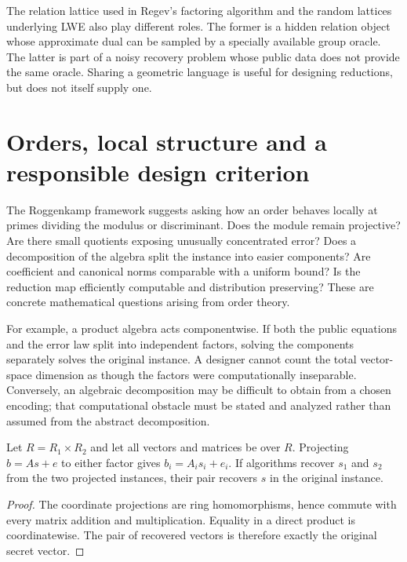 The relation lattice used in Regev's factoring algorithm and the random lattices underlying LWE also play different roles. The former is a hidden relation object whose approximate dual can be sampled by a specially available group oracle. The latter is part of a noisy recovery problem whose public data does not provide the same oracle. Sharing a geometric language is useful for designing reductions, but does not itself supply one.

\section{Orders, local structure and a responsible design criterion}
The Roggenkamp framework suggests asking how an order behaves locally at primes dividing the modulus or discriminant. Does the module remain projective? Are there small quotients exposing unusually concentrated error? Does a decomposition of the algebra split the instance into easier components? Are coefficient and canonical norms comparable with a uniform bound? Is the reduction map efficiently computable and distribution preserving? These are concrete mathematical questions arising from order theory.

For example, a product algebra acts componentwise. If both the public equations and the error law split into independent factors, solving the components separately solves the original instance. A designer cannot count the total vector-space dimension as though the factors were computationally inseparable. Conversely, an algebraic decomposition may be difficult to obtain from a chosen encoding; that computational obstacle must be stated and analyzed rather than assumed from the abstract decomposition.

\begin{proposition}
Let $R=R_1\times R_2$ and let all vectors and matrices be over $R$. Projecting
$b=As+e$ to either factor gives $b_i=A_is_i+e_i$. If algorithms recover $s_1$ and $s_2$ from the two projected instances, their pair recovers $s$ in the original instance.
\end{proposition}
\begin{proof}
The coordinate projections are ring homomorphisms, hence commute with every matrix addition and multiplication. Equality in a direct product is coordinatewise. The pair of recovered vectors is therefore exactly the original secret vector.
\end{proof}

